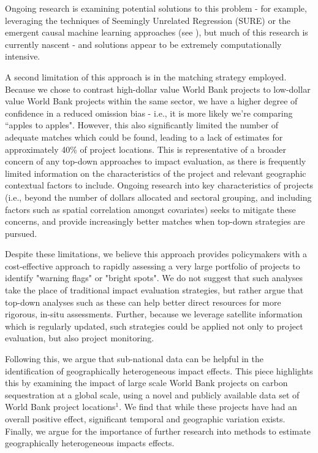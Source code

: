 \documentclass{article}\usepackage[]{graphicx}\usepackage[]{color}
\newenvironment{knitrout}{}{}  %
\begin{document}
\begin{knitrout}
Ongoing research is examining potential solutions to this problem - for example, leveraging the techniques of Seemingly Unrelated Regression (SURE) or the emergent causal machine learning approaches (see \cite{athey_recursive_2015}), but much of this research is currently nascent - and solutions appear to be extremely computationally intensive.
\par
A second limitation of this approach is in the matching strategy employed.
Because we chose to contrast high-dollar value World Bank projects to low-dollar value World Bank projects within the same sector, we have a higher degree of confidence in a reduced omission bias - i.e., it is more likely we're comparing  ``apples to apples".
However, this also significantly limited the number of adequate matches which could be found, leading to a lack of estimates for approximately 40\% of project locations.
This is representative of a broader concern of any top-down approaches to impact evaluation, as there is frequently limited information on the characteristics of the project and relevant geographic contextual factors to include.
Ongoing research into key characteristics of projects (i.e., beyond the number of dollars allocated and sectoral grouping, and including factors such as spatial correlation amongst covariates) seeks to mitigate these concerns, and provide increasingly better matches when top-down strategies are pursued.
\par
Despite these limitations, we believe this approach provides policymakers with a cost-effective approach to rapidly assessing a very large portfolio of projects to identify "warning flags" or "bright spots".  
We do not suggest that such analyses take the place of traditional impact evaluation strategies, but rather argue that top-down analyses such as these can help better direct resources for more rigorous, in-situ assessments.
Further, because we leverage satellite information which is regularly updated, such strategies could be applied not only to project evaluation, but also project monitoring.
\par
Following this, we argue that sub-national data can be helpful in the identification of geographically heterogeneous impact effects. 
This piece highlights this by examining the impact of large scale World Bank projects on carbon sequestration at a global scale, using a novel and publicly available data set of World Bank project locations\begin{math}^{1}\end{math}.  
We find that while these projects have had an overall positive effect, significant temporal and geographic variation exists.
Finally, we argue for the importance of further research into methods to estimate geographically heterogeneous impacts effects.
\newpage


\end{knitrout}
\end{document}
